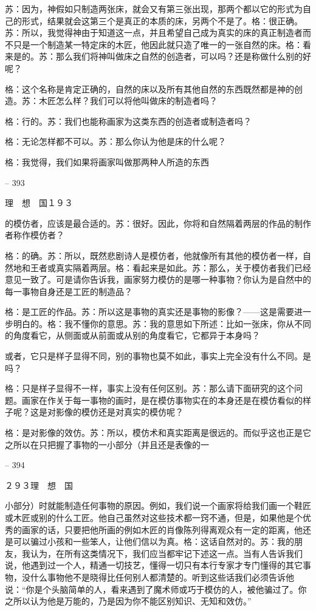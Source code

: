 \documentclass[11pt,oneside]{book}
\begin{document}
\begin{common-format}
    苏：因为，神假如只制造两张床，就会又有第三张出现，那两个都以它的形式为自己的形式，结果就会这第三个是真正的本质的床，另两个不是了。格：很正确。苏：所以，我觉得神由于知道这一点，并且希望自己成为真实的床的真正制造者而不只是一个制造某一特定床的木匠，他因此就只造了唯一的一张自然的床。格：看来是的。苏：那么我们将神叫做床之自然的创造者，可以吗？还是称做什么别的好呢？

    格：这个名称是肯定正确的，自然的床以及所有其他自然的东西既然都是神的创造。苏：木匠怎么样？我们可以将他叫做床的制造者吗？

    格：行的。苏：我们也能称画家为这类东西的创造者或制造者吗？

    格：无论怎样都不可以。苏：那么你认为他是床的什么呢？

    格：我觉得，我们如果将画家叫做那两种人所造的东西

    

-- 393

    理　想　国１９３

    的模仿者，应该是最合适的。苏：很好。因此，你将和自然隔着两层的作品的制作者称作模仿者？

    格：的确。苏：所以，既然悲剧诗人是模仿者，他就像所有其他的模仿者一样，自然地和王者或真实隔着两层。格：看起来是如此。苏：那么，关于模仿者我们已经意见一致了。可是请你告诉我，画家努力模仿的是哪一种事物？你认为是自然中的每一事物自身还是工匠的制造品？

    格：是工匠的作品。苏：所以这是事物的真实还是事物的影像？——这是需要进一步明白的。格：我不懂你的意思。苏：我的意思如下所述：比如一张床，你从不同的角度看它，从侧面或从前面或从别的角度看它，它都异于本身吗？

    或者，它只是样子显得不同，别的事物也莫不如此，事实上完全没有什么不同。是吗？

    格：只是样子显得不一样，事实上没有任何区别。苏：那么请下面研究的这个问题。画家在作关于每一事物的画时，是在模仿事物实在的本身还是在模仿看似的样子呢？这是对影像的模仿还是对真实的模仿呢？

    格：是对影像的效仿。苏：所以，模仿术和真实距离是很远的。而似乎这也正是它之所以在只把握了事物的一小部分（并且还是表像的一

    

-- 394

    ２９３理　想　国

    小部分）时就能制造任何事物的原因。例如，我们说一个画家将给我们画一个鞋匠或木匠或别的什么工匠。他自己虽然对这些技术都一窍不通，但是，如果他是个优秀的画家的话，只要把他所画的例如木匠的肖像陈列得离观众有一定的距离，他还是可以骗过小孩和一些笨人，让他们信以为真。格：这话自然对的。苏：我的朋友，我认为，在所有这类情况下，我们应当都牢记下述这一点。当有人告诉我们说，他遇到过一个人，精通一切技艺，懂得一切只有本行专家才专门懂得的其它事物，没什么事物他不是晓得比任何别人都清楚的。听到这些话我们必须告诉他说：“你是个头脑简单的人，看来遇到了魔术师或巧于模仿的人，被他骗过了。你之所以认为他是万能的，乃是因为你不能区别知识、无知和效仿。”


\end{common-format}
\end{document}
